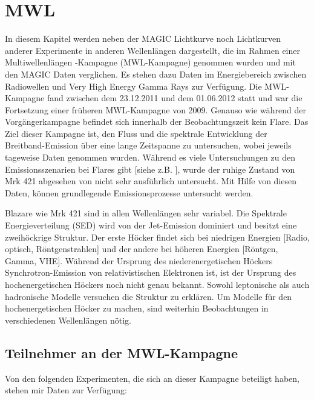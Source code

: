 \chapter{MWL}
\label{chapter:MWL}
In diesem Kapitel werden neben der MAGIC Lichtkurve noch Lichtkurven anderer Experimente in anderen Wellenlängen dargestellt, die im Rahmen einer Multiwellenlängen -Kampagne (MWL-Kampagne)  genommen wurden und mit den MAGIC Daten verglichen.
Es stehen dazu Daten im Energiebereich zwischen Radiowellen und Very High Energy Gamma Rays zur Verfügung.
Die MWL-Kampagne fand zwischen dem 23.12.2011 und dem 01.06.2012 statt und war die Fortsetzung einer früheren MWL-Kampagne von 2009.
Genauso wie während der Vorgängerkampagne befindet sich innerhalb der Beobachtungszeit kein Flare.
Das Ziel dieser Kampagne ist, den Fluss und die spektrale Entwicklung der Breitband-Emission über eine lange Zeitspanne zu untersuchen, wobei jeweils tageweise Daten genommen wurden.
Während es viele Untersuchungen zu den Emissionsszenarien bei Flares gibt [siehe z.B. \cite{Mrk421Flare}], wurde der ruhige Zustand von Mrk 421 abgesehen von \cite{MWL2009} nicht sehr ausführlich untersucht.
Mit Hilfe von diesen Daten, können grundlegende Emissionsprozesse untersucht werden.

Blazare wie Mrk 421 sind in allen Wellenlängen sehr variabel.
Die Spektrale Energieverteilung (SED) wird von der Jet-Emission dominiert und besitzt eine zweihöckrige Struktur.
Der erste Höcker findet sich bei niedrigen Energien [Radio, optisch, Röntgenstrahlen] und der andere bei höheren Energien [Röntgen, Gamma, VHE].
Während der Ursprung des niederenergetischen Höckers Synchrotron-Emission von relativistischen Elektronen ist, ist der Ursprung des hochenergetischen Höckers noch nicht genau bekannt.
Sowohl leptonische als auch hadronische Modelle versuchen die Struktur zu erklären.
Um Modelle für den hochenergetischen Höcker zu machen, sind weiterhin Beobachtungen in verschiedenen Wellenlängen nötig. 
 

\section{Teilnehmer an der MWL-Kampagne}
Von den folgenden Experimenten, die sich an dieser Kampagne beteiligt haben, stehen mir Daten zur Verfügung:

